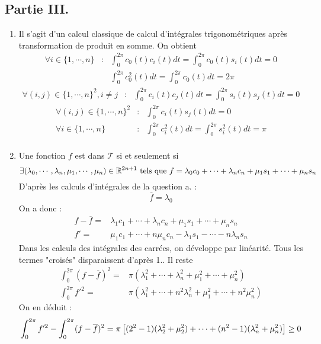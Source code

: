\subsection*{Partie III.}
\begin{enumerate}
 \item Il s'agit d'un calcul classique de calcul d'intégrales trigonométriques après transformation de produit en somme. On obtient
\begin{align*}
\forall i\in \{1,\cdots,n\} &: &\int_{0}^{2\pi}c_0(t)c_i(t)dt=\int_{0}^{2\pi}c_0(t)s_i(t)dt=0 \\
& &\int_{0}^{2\pi}c_0^2(t)dt=\int_{0}^{2\pi}c_0(t)dt=2\pi
\end{align*}
\begin{align*}
\forall (i,j)\in \{1,\cdots,n\}^2, i\neq j &: &\int_{0}^{2\pi}c_i(t)c_j(t)dt=\int_{0}^{2\pi}s_i(t)s_j(t)dt=0 
\end{align*}
\begin{align*}
\forall (i,j)\in \{1,\cdots,n\}^2 &: &\int_{0}^{2\pi}c_i(t)s_j(t)dt=0 \\
\forall i\in \{1,\cdots,n\} &: &\int_{0}^{2\pi}c_i^2(t)dt=\int_{0}^{2\pi}s_i^2(t)dt=\pi \\
\end{align*}

 \item Une fonction $f$ est dans $\mathcal T$ si et seulement si
\begin{displaymath}
 \exists (\lambda_0,\cdots,\lambda_n,\mu_1, \cdots , \mu_n )\in \mathbb{R}^{2n+1}
\text{ tels que }
f= \lambda_0c_0 +\cdots +\lambda_n c_n +\mu_1 s_1 + \cdots + \mu_ns_n
\end{displaymath}
D'après les calculs d'intégrales de la question a. :
\begin{displaymath}
 \overline{f} = \lambda_0
\end{displaymath}
On a donc :
\begin{align*}
 f-\overline{f} =& \lambda_1c_1 +\cdots +\lambda_n c_n +\mu_1 s_1 + \cdots + \mu_ns_n \\
f' =& \mu_1 c_1 + \cdots + n\mu_nc_n -\lambda_1s_1 -\cdots -n\lambda_n s_n
\end{align*}
Dans les calculs des intégrales des carrées, on développe par linéarité. Tous les termes "croisés" disparaissent d'après 1.. Il reste
\begin{align*}
 \int_{0}^{2\pi}(f-\overline{f})^2 =& \pi\left( \lambda_1^2 +\cdots +\lambda_n^2 +\mu_1^2 + \cdots + \mu_n^2 \right) \\
\int_{0}^{2\pi}f'^2 =& \pi\left( \lambda_1^2 +\cdots +n^2\lambda_n^2 +\mu_1^2 + \cdots + n^2\mu_n^2 \right)
\end{align*}
On en déduit :
\begin{displaymath}
 \int_{0}^{2\pi}f'^2 - \int_{0}^{2\pi}(f-\overline{f})^2
=
\pi\left[  \\
 (2^2-1)(\lambda_2^2+\mu_2^2)+ \cdots +(n^2-1)(\lambda_n^2+\mu_n^2)
\right] \geq 0
\end{displaymath}

\end{enumerate}

